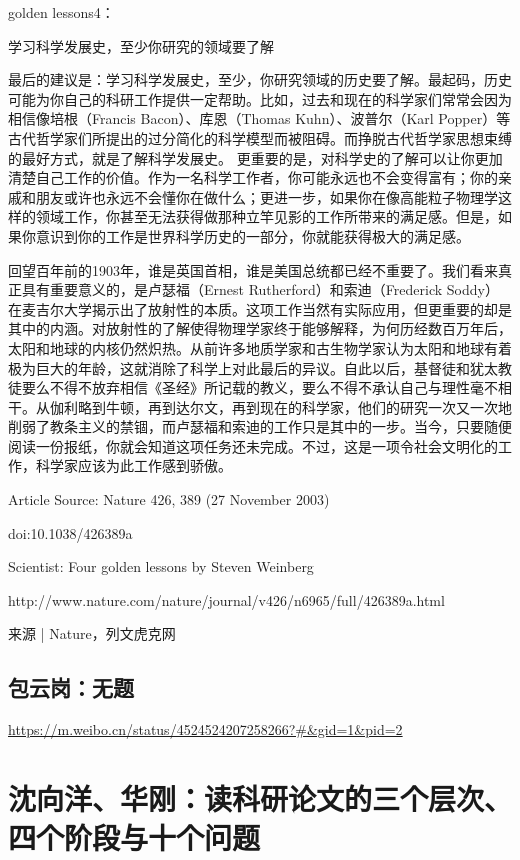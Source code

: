 golden lessons4：

学习科学发展史，至少你研究的领域要了解


最后的建议是：学习科学发展史，至少，你研究领域的历史要了解。最起码，历史可能为你自己的科研工作提供一定帮助。比如，过去和现在的科学家们常常会因为相信像培根（Francis Bacon）、库恩（Thomas Kuhn）、波普尔（Karl Popper）等古代哲学家们所提出的过分简化的科学模型而被阻碍。而挣脱古代哲学家思想束缚的最好方式，就是了解科学发展史。
更重要的是，对科学史的了解可以让你更加清楚自己工作的价值。作为一名科学工作者，你可能永远也不会变得富有；你的亲戚和朋友或许也永远不会懂你在做什么；更进一步，如果你在像高能粒子物理学这样的领域工作，你甚至无法获得做那种立竿见影的工作所带来的满足感。但是，如果你意识到你的工作是世界科学历史的一部分，你就能获得极大的满足感。

回望百年前的1903年，谁是英国首相，谁是美国总统都已经不重要了。我们看来真正具有重要意义的，是卢瑟福（Ernest Rutherford）和索迪（Frederick Soddy）在麦吉尔大学揭示出了放射性的本质。这项工作当然有实际应用，但更重要的却是其中的内涵。对放射性的了解使得物理学家终于能够解释，为何历经数百万年后，太阳和地球的内核仍然炽热。从前许多地质学家和古生物学家认为太阳和地球有着极为巨大的年龄，这就消除了科学上对此最后的异议。自此以后，基督徒和犹太教徒要么不得不放弃相信《圣经》所记载的教义，要么不得不承认自己与理性毫不相干。从伽利略到牛顿，再到达尔文，再到现在的科学家，他们的研究一次又一次地削弱了教条主义的禁锢，而卢瑟福和索迪的工作只是其中的一步。当今，只要随便阅读一份报纸，你就会知道这项任务还未完成。不过，这是一项令社会文明化的工作，科学家应该为此工作感到骄傲。

Article Source: Nature 426, 389 (27 November 2003)

doi:10.1038/426389a

Scientist: Four golden lessons by Steven Weinberg

http://www.nature.com/nature/journal/v426/n6965/full/426389a.html

来源 | Nature，列文虎克网


\subsection{ 包云岗：无题}

\url{https://m.weibo.cn/status/4524524207258266?#&gid=1&pid=2}


\section{沈向洋、华刚：读科研论文的三个层次、四个阶段与十个问题   }

